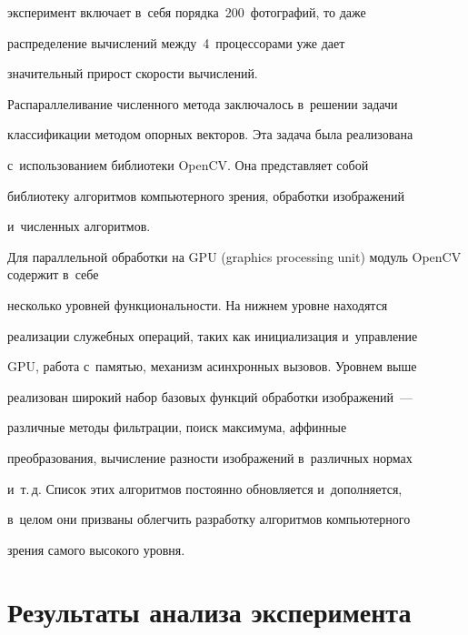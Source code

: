 эксперимент включает в~себя порядка~200~фотографий, то даже 


распределение вычислений между~4~процессорами уже дает 


значительный прирост скорости вычислений.


   


   Распараллеливание численного метода заключалось в~решении задачи 


классификации методом опорных векторов. Эта задача была реализована 


с~использованием библиотеки OpenCV. Она представляет собой 


библиотеку алгоритмов компьютерного зрения, обработки изображений 


и~численных алгоритмов.


   


   Для параллельной обработки на GPU (graphics processing unit) модуль OpenCV содержит в~себе 


несколько уровней функциональности. На нижнем уровне находятся 


реализации служебных операций, таких как инициализация и~управление 


GPU, работа с~памятью, механизм асинхронных вызовов. Уровнем выше 


реализован широкий набор базовых функций обработки изображений~--- 


различные методы фильт\-ра\-ции, поиск максимума, аффинные 


преобразования, вычисление разности изображений в~различных нормах 


и~т.\,д. Список этих алгоритмов постоянно обновляется и~дополняется, 


в~целом они призваны облегчить разработку алгоритмов компьютерного 


зрения самого высокого уровня.


   


\section{Результаты анализа эксперимента}





